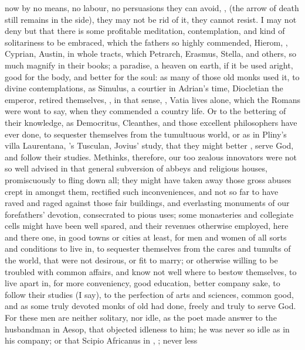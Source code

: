 now by no means, no labour, no persuasions they can avoid, , (the arrow of death still remains in the side), they may not
be rid of it, they cannot resist. I may not deny but that
there is some profitable meditation, contemplation, and kind of solitariness to
be embraced, which the fathers so highly commended,
Hierom, \Chrysostom{}, Cyprian, Austin, in whole tracts,
which Petrarch, Erasmus, Stella, and others, so much magnify in their books; a
paradise, a heaven on earth, if it be used aright, good for the body, and
better for the soul: as many of those old monks used it, to divine
contemplations, as Simulus, a courtier in Adrian's time, Diocletian the
emperor, retired themselves, \etc{}, in that sense, , Vatia lives alone, which the Romans were wont to say, when they
commended a country life. Or to the bettering of their knowledge, as
Democritus, Cleanthes, and those excellent philosophers have ever done, to
sequester themselves from the tumultuous world, or as in Pliny's villa
Laurentana, \Tully{}'s Tusculan, Jovius' study, that they might better , serve God, and follow their studies. Methinks, therefore, our
too zealous innovators were not so well advised in that general subversion of
abbeys and religious houses, promiscuously to fling down all; they might have
taken away those gross abuses crept in amongst them, rectified such
inconveniences, and not so far to have raved and raged against those fair
buildings, and everlasting monuments of our forefathers' devotion, consecrated
to pious uses; some monasteries and collegiate cells might have been well
spared, and their revenues otherwise employed, here and there one, in good
towns or cities at least, for men and women of all sorts and conditions to live
in, to sequester themselves from the cares and tumults of the world, that were
not desirous, or fit to marry; or otherwise willing to be troubled with common
affairs, and know not well where to bestow themselves, to live apart in, for
more conveniency, good education, better company sake, to follow their studies
(I say), to the perfection of arts and sciences, common good, and as some truly
devoted monks of old had done, freely and truly to serve God. For these men are
neither solitary, nor idle, as the poet made answer to the husbandman in Aesop,
that objected idleness to him; he was never so idle as in his company; or that
Scipio Africanus in \Tully{}, ; never less
